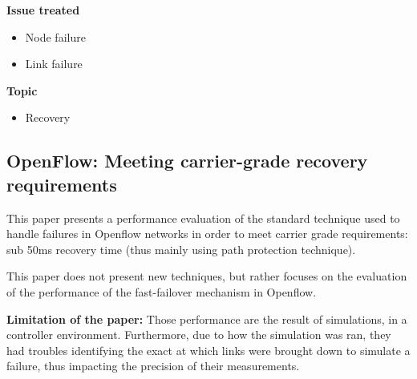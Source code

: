 \documentclass[compsoc]{IEEEtran}
\begin{document}
\textbf{Issue treated}
\begin{itemize}
	\item Node failure
	\item Link failure
\end{itemize}

\textbf{Topic}
\begin{itemize}
	\item Recovery
\end{itemize}

\subsection{OpenFlow: Meeting carrier-grade recovery requirements \cite{Sharma:2013:OMC:2445634.2445903}}
This paper presents a performance evaluation of the standard technique used to handle failures in Openflow networks in order to meet carrier grade requirements: sub 50ms recovery time (thus mainly using path protection technique).

This paper does not present new techniques, but rather focuses on the evaluation of the performance of the fast-failover mechanism in Openflow. 

\textbf{Limitation of the paper:}
Those performance are the result of simulations, in a controller environment. Furthermore, due to how the simulation was ran, they had troubles identifying the exact at which links were brought down to simulate a failure, thus impacting the precision of their measurements.
\end{document}

